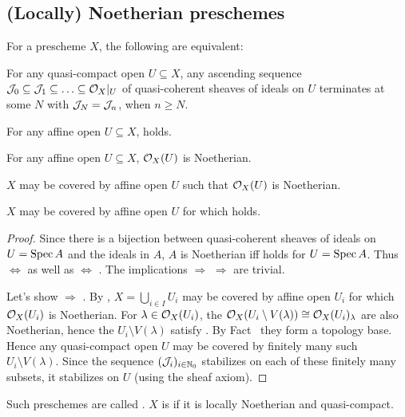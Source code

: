 \documentclass[a4paper,parskip=half,numbers=enddot, DIV=12]{scrreprt}
\begin{document}
\subsection{(Locally) Noetherian preschemes}

\begin{prop}
    For a prescheme $X$, the following are equivalent:
    \begin{alphanumerate}
    \item 
        For any quasi-compact open $U\subseteq X$, any ascending sequence $\mathcal{J}_0\subseteq \mathcal{J}_1\subseteq\ldots \subseteq \mathcal{O}_X|_U$ of quasi-coherent sheaves of ideals on $U$ terminates at some $N$ with $\mathcal{J}_N= \mathcal{J}_n$, when $n\geq N$.
    \item 
        For any affine open $U\subseteq X$,  holds.
    \item 
        For any affine open $U\subseteq X$, $\mathcal{O}_X(U)$ is Noetherian.
    \item  
        $X$ may be covered by affine open $U$ such that $\mathcal{O}_X(U)$ is Noetherian.
    \item   
        $X$ may be covered by affine open $U$ for which  holds.
    \end{alphanumerate}
\end{prop}
\begin{proof}
    Since there is a bijection between quasi-coherent sheaves of ideals on $U=\operatorname{Spec} A$ and the ideals in $A$, $A$ is Noetherian iff  holds for $U=\operatorname{Spec} A$. Thus  $\Leftrightarrow$  as well as  $\Leftrightarrow$ . The implications  $\Rightarrow$  $\Rightarrow$  are trivial.  
    
    Let's show  $\Rightarrow$ . By , $X=\bigcup_{i\in I}U_i$ may be covered by affine open $U_i$ for which $\mathcal{O}_X(U_i)$ is Noetherian. For $\lambda\in\mathcal{O}_X(U_i)$, the $\mathcal{O}_X(U_i\setminus V(\lambda)) \cong \mathcal{O}_X(U_i)_\lambda$ are also Noetherian, hence the $U_i\setminus V(\lambda)$ satisfy . By Fact~ they form a topology base. Hence any quasi-compact open $U$ may be covered by finitely many such $U_i\setminus V(\lambda)$. Since the sequence $(\mathcal{J}_i)_{i\in\mathbb{N}_0}$ stabilizes on each of these finitely many subsets, it stabilizes on $U$ (using the sheaf axiom).
\end{proof}
\begin{defi}
    Such preschemes are called . $X$ is  if it is locally Noetherian and quasi-compact.
\end{defi}
\end{document}
